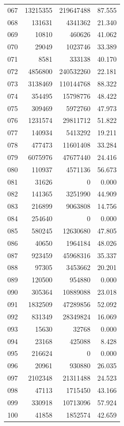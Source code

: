 \documentclass[anonymous,notoc]{gmcm2026}
\begin{document}
\begin{longtable}{lrrr}
067 & 13215355 & 219647488 & 87.555 \\
068 & 131631 & 4341362 & 21.340 \\
069 & 10810 & 460626 & 41.062 \\
070 & 29049 & 1023746 & 33.389 \\
071 & 8581 & 333138 & 40.170 \\
072 & 4856800 & 240532260 & 22.181 \\
073 & 3138469 & 110144768 & 88.322 \\
074 & 354495 & 15798776 & 48.422 \\
075 & 309469 & 5972760 & 47.973 \\
076 & 1231574 & 29811712 & 51.822 \\
077 & 140934 & 5413292 & 19.211 \\
078 & 477473 & 11601408 & 33.284 \\
079 & 6075976 & 47677440 & 24.416 \\
080 & 110937 & 4571136 & 56.673 \\
081 & 31626 & 0 & 0.000 \\
082 & 141365 & 3251990 & 44.909 \\
083 & 216899 & 9063808 & 14.756 \\
084 & 254640 & 0 & 0.000 \\
085 & 580245 & 12630680 & 47.805 \\
086 & 40650 & 1964184 & 48.026 \\
087 & 923459 & 45968316 & 35.337 \\
088 & 97305 & 3453662 & 20.201 \\
089 & 120500 & 954880 & 0.000 \\
090 & 305364 & 10889088 & 23.018 \\
091 & 1832509 & 47289856 & 52.092 \\
092 & 831349 & 28349824 & 16.069 \\
093 & 15630 & 32768 & 0.000 \\
094 & 23168 & 425088 & 8.428 \\
095 & 216624 & 0 & 0.000 \\
096 & 20961 & 930880 & 26.035 \\
097 & 2102348 & 21311488 & 24.523 \\
098 & 47113 & 1715450 & 43.166 \\
099 & 330918 & 10713096 & 57.924 \\
100 & 41858 & 1852574 & 42.659 \\
\end{longtable}
\end{document}
